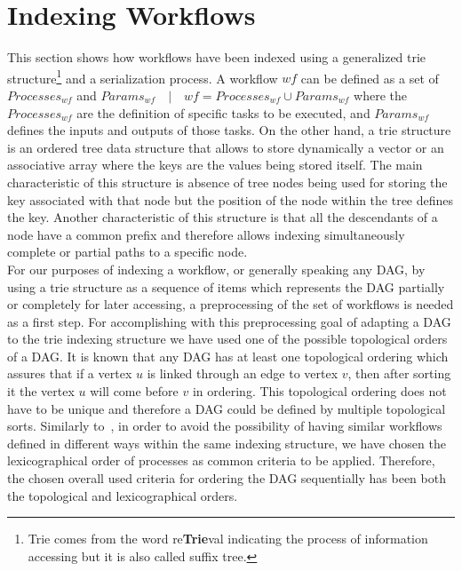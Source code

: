 \section{Indexing Workflows}
\label{sec:indexation}

This section shows how workflows have been indexed using a generalized trie structure\footnote{Trie comes from the word re{\bf Trie}val indicating the process of information accessing but it is also called suffix tree.} and a serialization process. 
A workflow $wf$ can be defined as a set of $Processes_{wf}$ and $Params_{wf} \quad | \quad wf = Processes_{wf} \cup Params_{wf}$ where the $Processes_{wf}$ are the definition of specific tasks to be executed, and $Params_{wf}$ defines the inputs and outputs of those tasks. On the other hand, a trie structure is an ordered tree data structure that allows to store dynamically a vector or an associative array where the keys are the values being stored itself. The main characteristic of this structure is absence of tree nodes being used for storing the key associated with that node but the position of the node within the tree defines the key. Another characteristic of this structure is that all the descendants of a node have a common prefix and therefore allows indexing simultaneously complete or partial paths to a specific node. \\

For our purposes of indexing a workflow, or generally speaking any DAG, by using a trie structure as a sequence of items which represents the DAG partially or completely for later accessing, a preprocessing of the set of workflows is needed as a first step. For accomplishing with this preprocessing goal of adapting a DAG to the trie indexing structure we have used one of the possible topological orders of a DAG. It is known that any DAG has at least one topological ordering which assures that if a vertex $u$ is linked through an edge to vertex $v$, then after sorting it the vertex $u$ will come before $v$ in ordering. This topological ordering does not have to be unique and therefore a DAG could be defined by multiple topological sorts. Similarly to~\cite{Matono03anindexing}, in order to avoid the possibility of having similar workflows defined in  different ways within the same indexing structure, we have chosen the lexicographical order of processes as common criteria to be applied. Therefore, the chosen overall used criteria for ordering the DAG sequentially has been both the topological and lexicographical orders. \\


